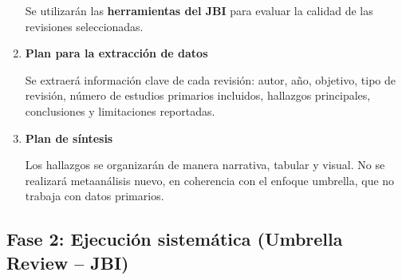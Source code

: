 \begin{enumerate}
    Se utilizarán las \textbf{herramientas del JBI} para evaluar la calidad de las revisiones seleccionadas.

    \item \textbf{Plan para la extracción de datos}  

    Se extraerá información clave de cada revisión: autor, año, objetivo, tipo de revisión, número de estudios primarios incluidos, hallazgos principales, conclusiones y limitaciones reportadas.

    \item \textbf{Plan de síntesis}  

    Los hallazgos se organizarán de manera narrativa, tabular y visual. No se realizará metaanálisis nuevo, en coherencia con el enfoque umbrella, que no trabaja con datos primarios.
\end{enumerate}

\subsection*{Fase 2: Ejecución sistemática (Umbrella Review – JBI)}

